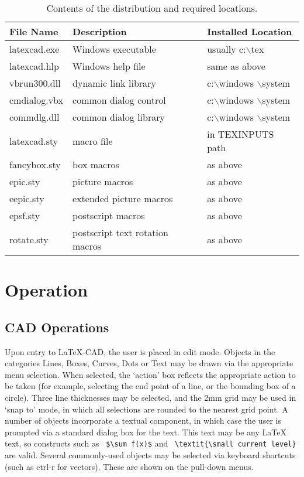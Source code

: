 \documentclass[a4paper]{article}
\newcommand{\bs}{$\backslash$}
\begin{document}
\begin{table}
    \begin{tabular}{lll}
        \hline\hline
        File Name & Description & Installed Location \\
        \hline
        latexcad.exe & Windows executable & usually c:\bs tex \\
        latexcad.hlp & Windows help file  & same as above  \\
        vbrun300.dll & dynamic link library    & c:\bs windows \bs system \\
        cmdialog.vbx & common dialog control   & c:\bs windows \bs system \\
        commdlg.dll  & common dialog library   & c:\bs windows \bs system \\
        latexcad.sty & macro file         & in TEXINPUTS path \\
        fancybox.sty & box macros         & as above \\
        epic.sty     & picture macros     & as above \\
        eepic.sty    & extended picture macros & as above \\
        epsf.sty     & postscript macros  & as above \\
        rotate.sty   & postscript text rotation macros  & as above \\
        \hline
    \end{tabular}
    \caption{Contents of the distribution and required locations.}
    \label{tab:files}
\end{table}

\section{ Operation }

\subsection{ CAD Operations }
Upon entry to LaTeX-CAD, the user is placed in edit mode. Objects in
the categories  Lines, Boxes, Curves, Dots or Text may be drawn via
the appropriate menu selection. When selected, the `action' box
reflects the appropriate action to be taken (for example, selecting
the end point of a line, or the bounding box of a circle). Three
line thicknesses may be selected, and the 2mm grid may be used in
`snap to' mode, in which all selections are rounded to the nearest
grid point. A number of objects incorporate a textual component, in
which case the user is prompted via a standard dialog box for the
text. This text may be any \LaTeX\/ text, so constructs such as
\verb! $\sum f(x)$! and \verb! \textit{\small current level}!
are valid. Several commonly-used objects may be selected via
keyboard shortcuts (such as ctrl-r for vectors). These are shown
on the pull-down menus.
\end{document}
